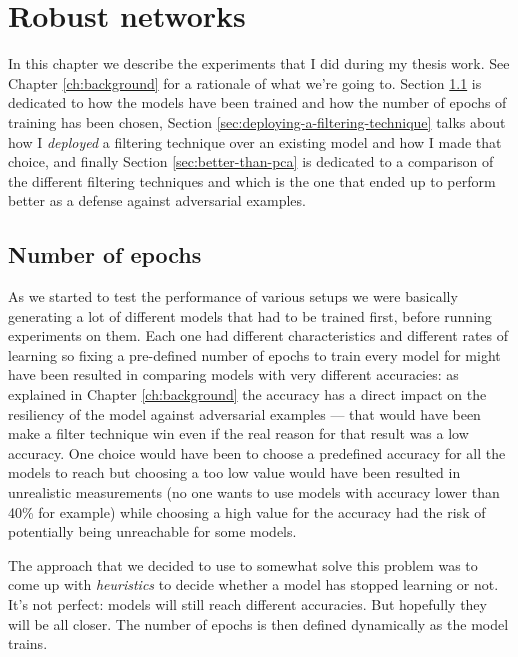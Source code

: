 \chapter{Robust networks}
\label{ch:robust-networks}

In this chapter we describe the experiments that I did during my thesis
work. See Chapter \ref{ch:background} for a rationale of what we're
going to. Section \ref{sec:number-of-epochs}
is dedicated to how the models have been trained and how the number of
epochs of training has been chosen, Section
\ref{sec:deploying-a-filtering-technique} talks about how I
\emph{deployed} a filtering technique over an existing model and how I
made that choice, and finally Section \ref{sec:better-than-pca} is
dedicated to a comparison of the different filtering techniques and
which is the one that ended up to perform better as a defense against
adversarial examples.

\section{Number of epochs}
\label{sec:number-of-epochs}

As we started to test the performance of various setups we were
basically generating a lot of different models that had to be trained
first, before running experiments on them. Each one had different
characteristics and different rates of learning so fixing a pre-defined
number of epochs to train every model for might have been resulted in
comparing models with very different accuracies: as explained in
Chapter \ref{ch:background} the accuracy has a direct impact on the
resiliency of the model against adversarial examples --- that would
have been make a filter technique win even if the real reason for that
result was a low accuracy. One choice would have been to choose a
predefined accuracy for all the models to reach but choosing a too low
value would have been resulted in unrealistic measurements (no one
wants to use models with accuracy lower than 40\% for example) while
choosing a high value for the accuracy had the risk of potentially
being unreachable for some models.

The approach that we decided to use to somewhat solve this problem was
to come up with \emph{heuristics} to decide whether a model has
stopped learning or not. It's not perfect: models will still reach
different accuracies. But hopefully they will be all closer. The number
of epochs is then defined dynamically as the model trains.

